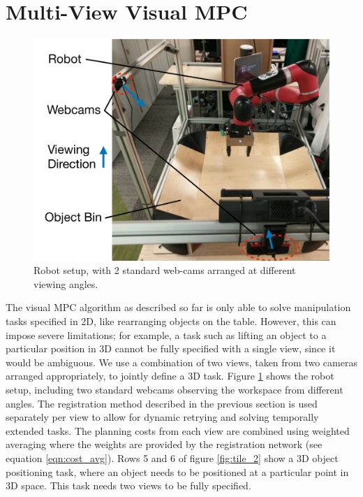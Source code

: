 \section{Multi-View Visual MPC}
\label{sec:multiview}
\begin{figure}
	\centering
	\includegraphics[width=0.5\columnwidth]{images_general/robot_setup_scheme.pdf}
	\caption{\small{Robot setup, with 2 standard web-cams arranged at different viewing angles.}}	\label{fig:robot_setup}
\end{figure}

The visual MPC algorithm as described so far is only able to solve manipulation tasks specified in 2D, like rearranging objects on the table. However, this can impose severe limitations; for example, a task such as lifting an object to a particular position in 3D cannot be fully specified with a single view, since it would be ambiguous. 
We use a combination of two views, taken from two cameras arranged appropriately, to jointly define a 3D task. Figure \ref{fig:robot_setup} shows the robot setup, including two standard webcams observing the workspace from different angles. The registration method described in the previous section is used separately per view to allow for dynamic retrying and solving temporally extended tasks. The planning costs from each view are combined using weighted averaging where the weights are provided by the registration network (see equation \ref{eqn:cost_avg}). Rows 5 and 6 of figure \ref{fig:tile_2} show a 3D object positioning task, where an object needs to be positioned at a particular point in 3D space. This task needs two views to be fully specified.





